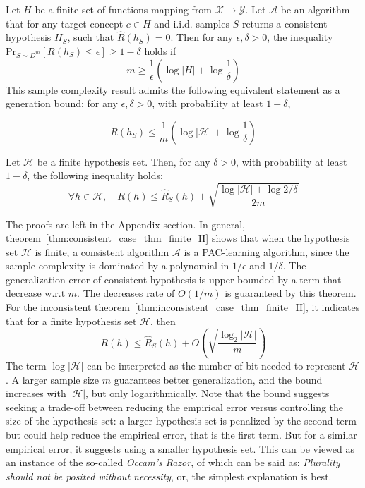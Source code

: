 \begin{theorem}
    \label{thm:consistent_case_thm_finite_H}
    Let $H$ be a finite set of functions mapping from $\mathcal{X}\to \mathcal{Y}$. Let $\mathcal{A}$ be an algorithm that for any target concept $c\in H$ and i.i.d. samples $S$ returns a consistent hypothesis $H_{S}$, such that $\hat{R}(h_{S}) = 0$. Then for any  $\epsilon,\delta>0$, the inequality $\mathrm{Pr}_{S\sim D^{m}}[R(h_{S})\leq \epsilon]\geq 1-\delta$ holds if $$m\geq \frac{1}{\epsilon}\left( \log{\lvert H \rvert }+\log{\frac{1}{\delta}} \right)$$
This sample complexity result admits the following equivalent statement as a generation bound: for any $\epsilon,\delta>0$, with probability at least $1-\delta$, 

\begin{equation}
    R(h_S) \leq \frac{1}{m} \left( \log{|\mathcal{H}|} + \log{\frac{1}{\delta}} \right)
\end{equation}
\end{theorem}

\begin{theorem}
    \label{thm:inconsistent_case_thm_finite_H}
    Let $\mathcal{H}$ be a finite hypothesis set. Then, for any $\delta > 0$, with probability at least $1-\delta$, the following inequality holds: 
    \begin{equation}
        \forall h \in \mathcal{H}, \quad R(h) \leq \hat{R}_S (h) + \sqrt{\frac{\log{|\mathcal{H}|}+ \log{2/\delta}}{2m}}
    \end{equation}
\end{theorem}
The proofs are left in the Appendix section. In general, theorem~\ref{thm:consistent_case_thm_finite_H} shows that when the hypothesis set $\mathcal{H}$ is finite, a consistent algorithm $\mathcal{A}$ is a PAC-learning algorithm, since the sample complexity is dominated by a polynomial in $1/\epsilon$ and $1/\delta$. The generalization error of consistent hypothesis is upper bounded by a term that decrease w.r.t $m$. The decreases rate of $O(1/m)$ is guaranteed by this theorem. For the inconsistent theorem~\ref{thm:inconsistent_case_thm_finite_H}, it indicates that for a finite hypothesis set $\mathcal{H}$, then 
\begin{equation}
    R(h) \leq \hat{R}_S (h) + O \left( \sqrt{\frac{\log_{2}{|\mathcal{H}|}}{m}} \right)
\end{equation}
The term $\log{|\mathcal{H}|}$ can be interpreted as the number of bit needed to represent $\mathcal{H}$. A larger sample size $m$ guarantees better generalization, and the bound increases with $|\mathcal{H}|$, but only logarithmically. Note that the bound suggests seeking a trade-off between reducing the empirical error versus controlling the size of the hypothesis set: a larger hypothesis set is penalized by the second term but could help reduce the empirical error, that is the first term. But for a similar empirical error, it suggests using a smaller hypothesis set. This can be viewed as an instance of the so-called \textit{Occam's Razor}, of which can be said as: \textit{Plurality should not be posited without necessity}, or, the simplest explanation is best.

